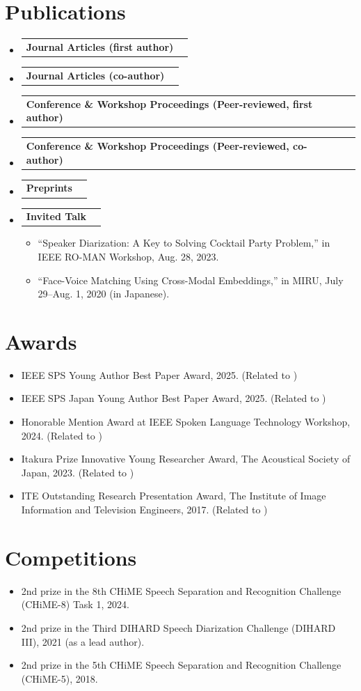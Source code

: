 \documentclass[letterpaper,11pt]{article}
\makeatletter
\newcommand{\resumeItem}[1]{
  \item\small{
    {#1 \vspace{-2pt}}
  }
}
\newcommand{\resumeShortSubheading}[2]{
  \vspace{-2pt}\item
    \begin{tabular*}{0.97\textwidth}[t]{l@{\extracolsep{\fill}}r}
      \textbf{#1} & #2 \\
    \end{tabular*}\vspace{-7pt}
}
\newcommand{\resumeSubHeadingListStart}{\begin{itemize}[leftmargin=0.15in, label={}]}
\newcommand{\resumeSubHeadingListEnd}{\end{itemize}}
\newcommand{\resumeItemListStart}{\begin{itemize}}
\newcommand{\resumeItemListEnd}{\end{itemize}\vspace{-5pt}}
\makeatother
\begin{document}
\section{Publications}
  \resumeSubHeadingListStart
    \resumeShortSubheading
      {Journal Articles (first author)}{}
      \nocite{*}
      \printbibliography[type=article,heading=none,keyword=first]
    \resumeShortSubheading
      {Journal Articles (co-author)}{}
      \printbibliography[type=article,heading=none,notkeyword=first]
    \resumeShortSubheading
      {Conference \& Workshop Proceedings (Peer-reviewed, first author)}{}
      \printbibliography[type=inproceedings,heading=none,keyword=first]
    \resumeShortSubheading
      {Conference \& Workshop Proceedings (Peer-reviewed, co-author)}{}
      \printbibliography[type=inproceedings,heading=none,notkeyword=first]
    \resumeShortSubheading
      {Preprints}{}
      \printbibliography[type=misc,heading=none]
    \resumeShortSubheading
      {\textbf{Invited Talk}}{}
      \resumeItemListStart
        \resumeItem{``Speaker Diarization: A Key to Solving Cocktail Party Problem,'' in IEEE RO-MAN Workshop, Aug. 28, 2023.}
        \resumeItem{``Face-Voice Matching Using Cross-Modal Embeddings,'' in MIRU, July 29--Aug. 1, 2020 (in Japanese).}
      \resumeItemListEnd
  \resumeSubHeadingListEnd

\section{Awards}
  \resumeItemListStart
    \resumeItem{IEEE SPS Young Author Best Paper Award, 2025. (Related to \cite{horiguchi2022encoderdecoder})}
    \resumeItem{IEEE SPS Japan Young Author Best Paper Award, 2025. (Related to \cite{horiguchi2023online})}
    \resumeItem{Honorable Mention Award at IEEE Spoken Language Technology Workshop, 2024. (Related to \cite{horiguchi2024recursive})}
    \resumeItem{Itakura Prize Innovative Young Researcher Award, The Acoustical Society of Japan, 2023. (Related to \cite{horiguchi2022encoderdecoder})}
    \resumeItem{ITE Outstanding Research Presentation Award, The Institute of Image Information and Television Engineers, 2017. (Related to \cite{horiguchi2020significance})}
  \resumeItemListEnd

\section{Competitions}
  \resumeItemListStart
    \resumeItem{2nd prize in the 8th CHiME Speech Separation and Recognition Challenge (CHiME-8) Task 1, 2024.}
    \resumeItem{2nd prize in the Third DIHARD Speech Diarization Challenge (DIHARD III), 2021  (as a lead author).}
    \resumeItem{2nd prize in the 5th CHiME Speech Separation and Recognition Challenge (CHiME-5), 2018.}
  \resumeItemListEnd
\end{document}
